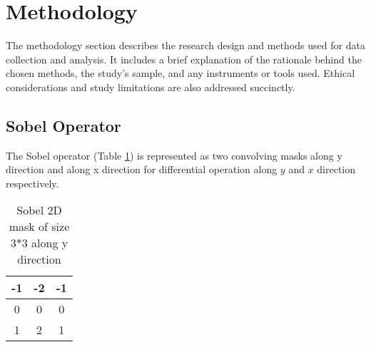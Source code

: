 \section{Methodology}
\label{section:methods}
The methodology section describes the research design and methods used for data collection and analysis. It includes a brief explanation of the rationale behind the chosen methods, the study's sample, and any instruments or tools used. Ethical considerations and study limitations are also addressed succinctly.

\subsection{Sobel Operator}
The Sobel operator (Table \ref{tab:sobel}) is represented as two convolving masks along y direction and along x direction for differential operation along $y$ and $x$ direction respectively.
\begin{table}[!htp]
\centering
\begin{tabular}{|c|c|c|}
    \hline
    -1 & -2 & -1 \\ \hline
    0 & 0 & 0 \\ \hline
    1 & 2 & 1 \\
    \hline
\end{tabular}
\caption{Sobel 2D mask of size 3*3 along y direction}
\label{tab:sobel}
\end{table}


